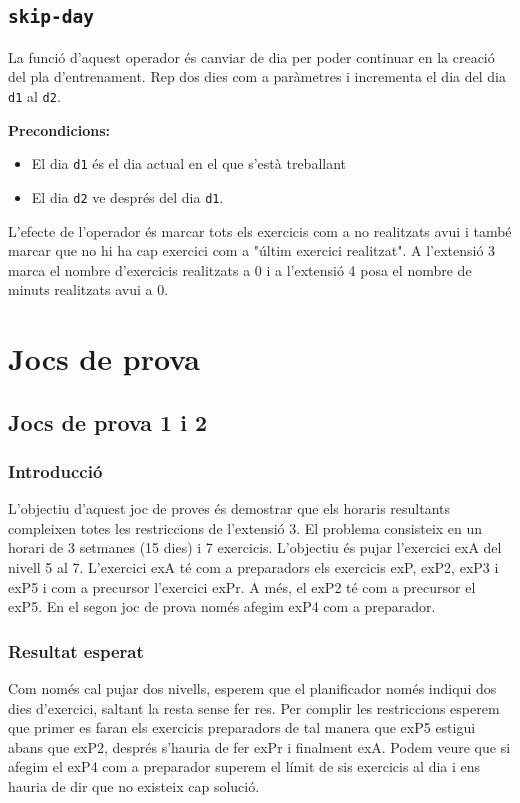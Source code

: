 \documentclass[a4paper,12pt, UTF-8]{article}
\begin{document}
\subsection{\texttt{skip-day}}

La funció d'aquest operador és canviar de dia per poder continuar en la creació del pla d'entrenament. Rep dos dies com a paràmetres i incrementa el dia del dia \verb|d1| al \verb|d2|.

\textbf{Precondicions: }
\begin{itemize}
	\item El dia \verb|d1| és el dia actual en el que s'està treballant
	\item El dia \verb|d2| ve després del dia \verb|d1|.
\end{itemize}

L'efecte de l'operador és marcar tots els exercicis com a no realitzats avui i també marcar que no hi ha cap exercici com a "últim exercici realitzat". A l'extensió 3 marca el nombre d'exercicis realitzats a 0 i a l'extensió 4 posa el nombre de minuts realitzats avui a 0.

\section{Jocs de prova}

\subsection{Jocs de prova 1 i 2}

\subsubsection{Introducció}

L'objectiu d'aquest joc de proves és demostrar que els horaris resultants compleixen totes les restriccions de l'extensió 3. El problema consisteix en un horari de 3 setmanes (15 dies) i 7 exercicis. L'objectiu és pujar l'exercici exA del nivell 5 al 7. L'exercici exA té com a preparadors els exercicis exP, exP2, exP3 i exP5 i com a precursor l'exercici exPr. A més, el exP2 té com a precursor el exP5. En el segon joc de prova només afegim exP4 com a preparador.

\subsubsection{Resultat esperat}

Com només cal pujar dos nivells, esperem que el planificador només indiqui dos dies d'exercici, saltant la resta sense fer res. Per complir les restriccions esperem que primer es faran els exercicis preparadors de tal manera que exP5 estigui abans que exP2, després s'hauria de fer exPr i finalment exA. Podem veure que si afegim el exP4 com a preparador superem el límit de sis exercicis al dia i ens hauria de dir que no existeix cap solució.
\end{document}
